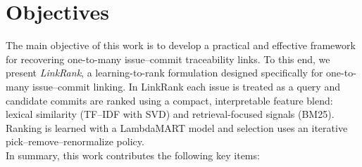 \section{Objectives}

The main objective of this work is to develop a practical and effective framework for recovering one-to-many issue--commit traceability links. To this end, we present \emph{LinkRank}, a learning-to-rank formulation designed specifically for one-to-many issue--commit linking. In LinkRank each issue is treated as a query and candidate commits are ranked using a compact, interpretable feature blend: lexical similarity (TF--IDF with SVD) and retrieval-focused signals (BM25). Ranking is learned with a LambdaMART model and selection uses an iterative pick--remove--renormalize policy.\\

\noindent
In summary, this work contributes the following key items:

